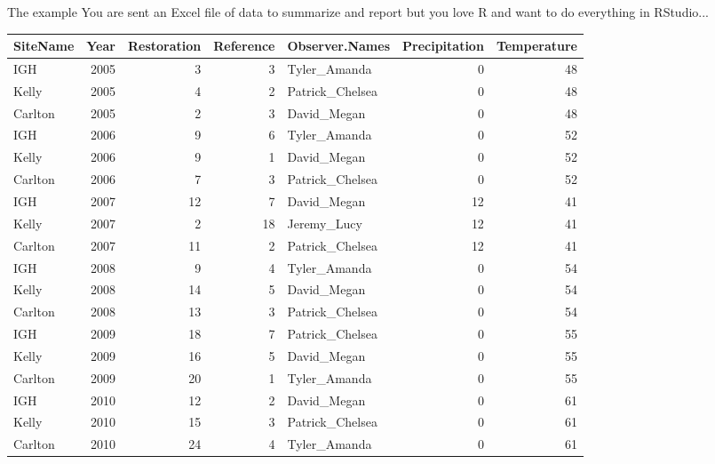 \documentclass[xcolor=svgnames]{beamer}\usepackage[]{graphicx}\usepackage[]{color}
\begin{document}
\begin{frame}[shrink]{The example}
You are sent an Excel file of data to summarize and report but you love R and want to do everything in RStudio...
\begin{table}[ht]
\centering
{\scriptsize
\begin{tabular}{lrrrlrr}
  \hline
SiteName & Year & Restoration & Reference & Observer.Names & Precipitation & Temperature \\ 
  \hline
IGH &  2005 &     3 &     3 & Tyler\_Amanda &     0 &    48 \\ 
  Kelly &  2005 &     4 &     2 & Patrick\_Chelsea &     0 &    48 \\ 
  Carlton &  2005 &     2 &     3 & David\_Megan &     0 &    48 \\ 
  IGH &  2006 &     9 &     6 & Tyler\_Amanda &     0 &    52 \\ 
  Kelly &  2006 &     9 &     1 & David\_Megan &     0 &    52 \\ 
  Carlton &  2006 &     7 &     3 & Patrick\_Chelsea &     0 &    52 \\ 
  IGH &  2007 &    12 &     7 & David\_Megan &    12 &    41 \\ 
  Kelly &  2007 &     2 &    18 & Jeremy\_Lucy &    12 &    41 \\ 
  Carlton &  2007 &    11 &     2 & Patrick\_Chelsea &    12 &    41 \\ 
  IGH &  2008 &     9 &     4 & Tyler\_Amanda &     0 &    54 \\ 
  Kelly &  2008 &    14 &     5 & David\_Megan &     0 &    54 \\ 
  Carlton &  2008 &    13 &     3 & Patrick\_Chelsea &     0 &    54 \\ 
  IGH &  2009 &    18 &     7 & Patrick\_Chelsea &     0 &    55 \\ 
  Kelly &  2009 &    16 &     5 & David\_Megan &     0 &    55 \\ 
  Carlton &  2009 &    20 &     1 & Tyler\_Amanda &     0 &    55 \\ 
  IGH &  2010 &    12 &     2 & David\_Megan &     0 &    61 \\ 
  Kelly &  2010 &    15 &     3 & Patrick\_Chelsea &     0 &    61 \\ 
  Carlton &  2010 &    24 &     4 & Tyler\_Amanda &     0 &    61 \\ 
   \hline
\end{tabular}
}
\end{table}


\end{frame}
\end{document}
